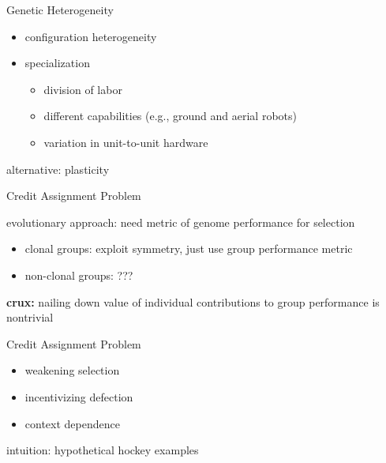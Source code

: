 \begin{frame}{Genetic Heterogeneity}

\Large

\begin{itemize}
\item configuration heterogeneity
\item specialization
\begin{itemize}
\item division of labor \cite{potter2001heterogeneity}
\item different capabilities (e.g., ground and aerial robots) \cite{gomes2015cooperative, mathews2012supervised}
\item variation in unit-to-unit hardware \cite{pugh2007parallel, duarte2016evolution}
\end{itemize}
\end{itemize}

alternative: plasticity \cite{tuci2008evolving}

\end{frame}

\begin{frame}{Credit Assignment Problem}

\Large

evolutionary approach: need metric of genome performance for selection
\begin{itemize}
\item clonal groups: exploit symmetry, just use group performance metric
\item non-clonal groups: ???
\end{itemize}

\textbf{crux:} nailing down value of individual contributions to group performance is nontrivial \cite{panait2005cooperative}

\end{frame}

\begin{frame}{Credit Assignment Problem}

\Large

\begin{itemize}
\item weakening selection \cite{knudson2010coevolution, waibel2009genetic}
\item incentivizing defection \cite{knudson2010coevolution, waibel2009genetic}
\item context dependence \cite{gomes2015cooperative}
\end{itemize}

\pause

intuition: hypothetical hockey examples

\end{frame}

